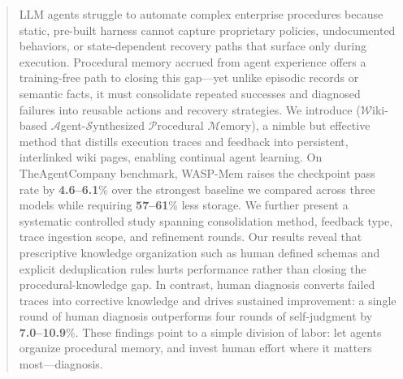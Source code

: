 


\begin{abstract}
  LLM agents struggle to automate complex enterprise procedures because static, pre-built harness cannot capture proprietary policies, undocumented behaviors, or state-dependent recovery paths that surface only during execution. Procedural memory accrued from agent experience offers a training-free path to closing this gap—yet unlike episodic records or semantic facts, it must consolidate repeated successes and diagnosed failures into reusable actions and recovery strategies. We introduce \method (\(\mathcal{W}\)iki-based \(\mathcal{A}\)gent-\(\mathcal{S}\)ynthesized \(\mathcal{P}\)rocedural \(\mathcal{M}\)emory), a nimble but effective method that distills execution traces and feedback into persistent, interlinked wiki pages, enabling continual agent learning. On TheAgentCompany benchmark, WASP-Mem raises the checkpoint pass rate by \textbf{4.6–6.1}\% over the strongest baseline we compared across three models while requiring \textbf{57–61}\% less storage. We further present a systematic controlled study spanning consolidation method, feedback type, trace ingestion scope, and refinement rounds. Our results reveal that prescriptive knowledge organization such as human defined schemas and explicit deduplication rules hurts performance rather than closing the procedural-knowledge gap. In contrast, human diagnosis converts failed traces into corrective knowledge and drives sustained improvement: a single round of human diagnosis outperforms four rounds of self-judgment by \textbf{7.0–10.9}\%. These findings point to a simple division of labor: let agents organize procedural memory, and invest human effort where it matters most—diagnosis.
\end{abstract}
